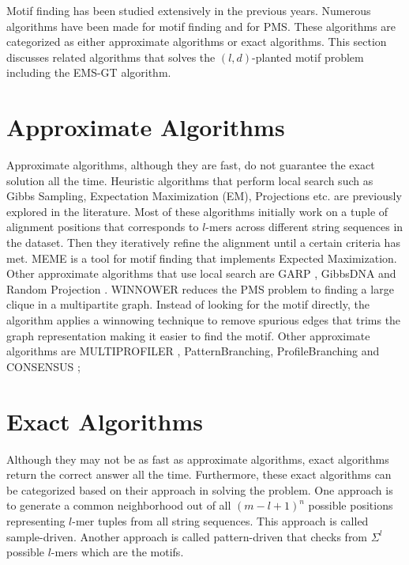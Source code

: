 Motif finding has been studied extensively in the previous years. Numerous algorithms have been made for motif finding and for PMS. These algorithms are categorized as either approximate algorithms or exact algorithms. This section discusses related algorithms that solves the $(l, d)$-planted motif problem including the EMS-GT algorithm.

\section{Approximate Algorithms}
Approximate algorithms, although they are fast, do not guarantee the exact solution all the time. Heuristic algorithms that perform local search such as Gibbs Sampling, Expectation Maximization (EM),  Projections etc. are previously explored in the literature. Most of these algorithms initially work on a tuple of alignment positions that corresponds to $l$-mers across different string sequences in the dataset. Then they iteratively refine the alignment until a certain criteria has met. MEME \cite{Bailey2006} is a tool for motif finding that implements Expected Maximization. Other approximate algorithms that use local search are GARP \cite{huo2009combining}, GibbsDNA \cite{lawrence1993detecting} and Random Projection \cite{Buhler2001Tompa, huo2009combining}. WINNOWER \cite{pevzner2000combinatorial} reduces the PMS problem to finding a large clique in a multipartite graph. Instead of looking for the motif directly, the algorithm applies a winnowing technique to remove spurious edges that trims the graph representation making it easier to find the motif. Other approximate algorithms are MULTIPROFILER \cite{Keich01102002},  PatternBranching, ProfileBranching \cite{Price27092003} and CONSENSUS \cite{hertz1999identifying};

\section{Exact Algorithms}
Although they may not be as fast as approximate algorithms, exact algorithms return the correct answer all the time. Furthermore, these exact algorithms can be categorized based on their approach in solving the problem. One approach is to generate a common neighborhood out of all $(m - l + 1)^n$ possible positions representing $l$-mer tuples from all string sequences. This approach is called sample-driven. Another approach is called pattern-driven that checks from $\Sigma^l$ possible $l$-mers which are the motifs. 

